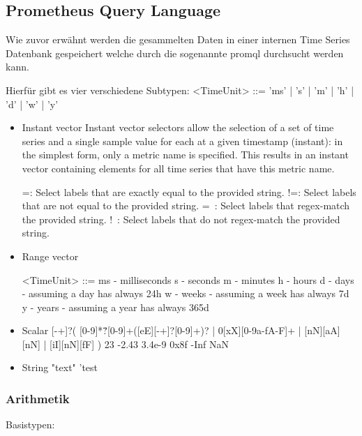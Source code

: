 \subsection{Prometheus Query Language}
Wie zuvor erwähnt werden die gesammelten Daten in einer internen Time Series Datenbank gespeichert welche durch die sogenannte \gls{promql} durchsucht werden kann.

Hierfür gibt es vier verschiedene Subtypen:
	<TimeUnit> ::= 'ms' | 's' | 'm' | 'h' | 'd' | 'w' | 'y'
\begin{itemize}
	\item Instant vector
	Instant vector selectors allow the selection of a set of time series and a single sample value for each at a given timestamp (instant): in the simplest form, only a metric name is specified. This results in an instant vector containing elements for all time series that have this metric name.
	
	
	=: Select labels that are exactly equal to the provided string.
	!=: Select labels that are not equal to the provided string.
	=~: Select labels that regex-match the provided string.
	!~: Select labels that do not regex-match the provided string.
	
	
	
	\item Range vector
	
	<TimeUnit> ::=
	ms - milliseconds
	s - seconds
	m - minutes
	h - hours
	d - days - assuming a day has always 24h
	w - weeks - assuming a week has always 7d
	y - years - assuming a year has always 365d
	
	
	\item Scalar
	[-+]?(
	[0-9]*\.?[0-9]+([eE][-+]?[0-9]+)?
	| 0[xX][0-9a-fA-F]+
	| [nN][aA][nN]
	| [iI][nN][fF]
	)
	23
	-2.43
	3.4e-9
	0x8f
	-Inf
	NaN
	\item String
	"text"
	'test
\end{itemize}

\subsubsection{Arithmetik}

Basistypen:

